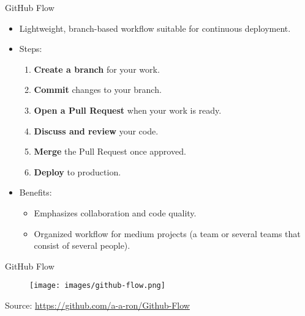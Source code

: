 \documentclass{beamer}
\begin{document}
\begin{frame}{GitHub Flow}
  \begin{itemize}
      \item Lightweight, branch-based workflow suitable for continuous deployment.
      \item Steps:
      \begin{enumerate}
          \item \textbf{Create a branch} for your work.
          \item \textbf{Commit} changes to your branch.
          \item \textbf{Open a Pull Request} when your work is ready.
          \item \textbf{Discuss and review} your code.
          \item \textbf{Merge} the Pull Request once approved.
          \item \textbf{Deploy} to production.
      \end{enumerate}
      \item Benefits:
      \begin{itemize}
        \item Emphasizes collaboration and code quality.
        \item Organized workflow for medium projects (a team or several teams that consist of several people).
      \end{itemize}
  \end{itemize}
\end{frame}

\begin{frame}{GitHub Flow}
  \begin{figure}[h]
    \centering
    \texttt{[image: images/github-flow.png]}
  \end{figure}
  {\footnotesize Source: \href{https://github.com/a-a-ron/Github-Flow}{https://github.com/a-a-ron/Github-Flow}}
\end{frame}
\end{document}
